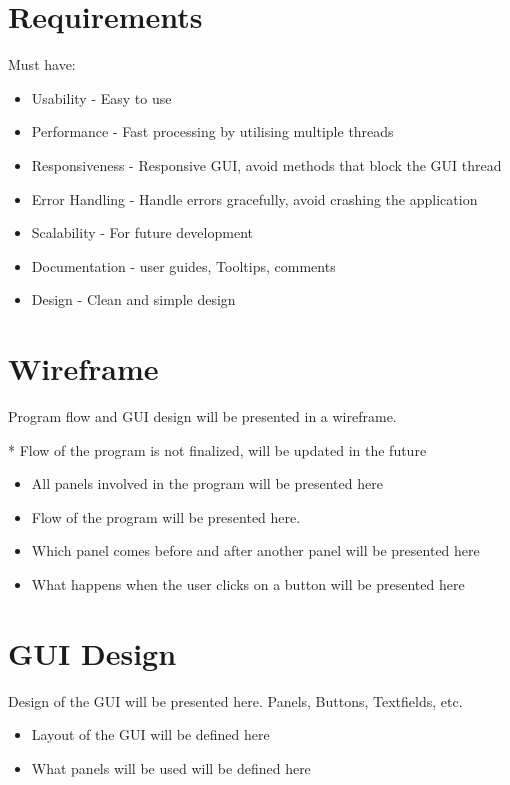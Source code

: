 \section{Requirements}

Must have:
\begin{itemize}
	\item Usability - Easy to use
	\item Performance - Fast processing by utilising multiple threads
	\item Responsiveness - Responsive GUI, avoid methods that block the GUI thread
	\item Error Handling - Handle errors gracefully, avoid crashing the application
	\item Scalability - For future development
	\item Documentation - user guides, Tooltips, comments
	\item Design - Clean and simple design
\end{itemize}

\section{Wireframe}
Program flow and GUI design will be presented in a wireframe.

* Flow of the program is not finalized, will be updated in the future

\begin{itemize}
	\item All panels involved in the program will be presented here
	\item Flow of the program will be presented here.
	\item Which panel comes before and after another panel will be presented here
	\item What happens when the user clicks on a button will be presented here
\end{itemize}

\section{GUI Design}
Design of the GUI will be presented here. Panels, Buttons, Textfields, etc.

\begin{itemize}
	\item Layout of the GUI will be defined here
	\item What panels will be used will be defined here
\end{itemize}

